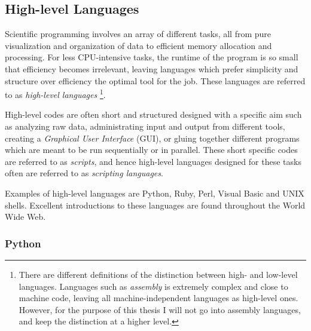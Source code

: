 % 
% 


\subsection{High-level Languages}

Scientific programming involves an array of different tasks, all from pure visualization and organization of data to efficient memory allocation and processing. For less CPU-intensive tasks, the runtime of the program is so small that efficiency becomes irrelevant, leaving languages which prefer simplicity and structure over efficiency the optimal tool for the job. These languages are referred to as \textit{high-level languages} \footnote{There are different definitions of the distinction between high- and low-level languages. Languages such as \textit{assembly} is extremely complex and close to machine code, leaving all machine-independent languages as high-level ones. However, for the purpose of this thesis I will not go into assembly languages, and keep the distinction at a higher level.}.

High-level codes are often short and structured designed with a specific aim such as analyzing raw data, administrating input and output from different tools, creating a \textit{Graphical User Interface} (GUI), or gluing together different programs which are meant to be run sequentially or in parallel. These short specific codes are referred to as \textit{scripts}, and hence high-level languages designed for these tasks often are referred to as \textit{scripting languages}\cite{inf3331, pythonBook}. 

Examples of high-level languages are Python, Ruby, Perl, Visual Basic and UNIX shells. Excellent introductions to these languages are found throughout the World Wide Web.

\subsubsection{Python}
\label{sec:Python}

